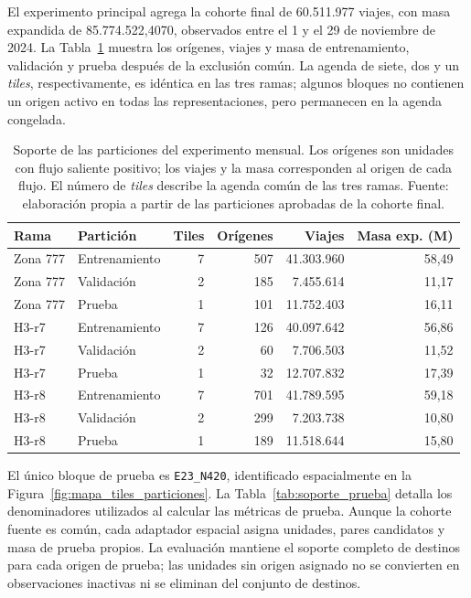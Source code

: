 El experimento principal agrega la cohorte final de 60.511.977 viajes, con masa expandida de 85.774.522,4070, observados entre el 1 y el 29 de noviembre de 2024. La Tabla~\ref{tab:particiones_mensuales} muestra los orígenes, viajes y masa de entrenamiento, validación y prueba después de la exclusión común. La agenda de siete, dos y un \textit{tiles}, respectivamente, es idéntica en las tres ramas; algunos bloques no contienen un origen activo en todas las representaciones, pero permanecen en la agenda congelada.

\begin{table}[htbp]
\centering
\fontsize{11}{13.6}\selectfont
\renewcommand{\arraystretch}{1.08}
\caption{Soporte de las particiones del experimento mensual. Los orígenes son unidades con flujo saliente positivo; los viajes y la masa corresponden al origen de cada flujo. El número de \textit{tiles} describe la agenda común de las tres ramas. Fuente: elaboración propia a partir de las particiones aprobadas de la cohorte final.}
\label{tab:particiones_mensuales}
\begin{tabular*}{\textwidth}{@{\extracolsep{\fill}}llrrrr@{}}
\toprule
\textbf{Rama} & \textbf{Partición} & \textbf{Tiles} & \textbf{Orígenes} & \textbf{Viajes} & \textbf{Masa exp. (M)} \\
\midrule
Zona 777 & Entrenamiento & 7 & 507 & 41.303.960 & 58,49 \\
Zona 777 & Validación & 2 & 185 & 7.455.614 & 11,17 \\
Zona 777 & Prueba & 1 & 101 & 11.752.403 & 16,11 \\
\midrule
H3-r7 & Entrenamiento & 7 & 126 & 40.097.642 & 56,86 \\
H3-r7 & Validación & 2 & 60 & 7.706.503 & 11,52 \\
H3-r7 & Prueba & 1 & 32 & 12.707.832 & 17,39 \\
\midrule
H3-r8 & Entrenamiento & 7 & 701 & 41.789.595 & 59,18 \\
H3-r8 & Validación & 2 & 299 & 7.203.738 & 10,80 \\
H3-r8 & Prueba & 1 & 189 & 11.518.644 & 15,80 \\
\bottomrule
\end{tabular*}
\end{table}

El único bloque de prueba es \texttt{E23\_N420}, identificado espacialmente en la Figura~\ref{fig:mapa_tiles_particiones}. La Tabla~\ref{tab:soporte_prueba} detalla los denominadores utilizados al calcular las métricas de prueba. Aunque la cohorte fuente es común, cada adaptador espacial asigna unidades, pares candidatos y masa de prueba propios. La evaluación mantiene el soporte completo de destinos para cada origen de prueba; las unidades sin origen asignado no se convierten en observaciones inactivas ni se eliminan del conjunto de destinos.

